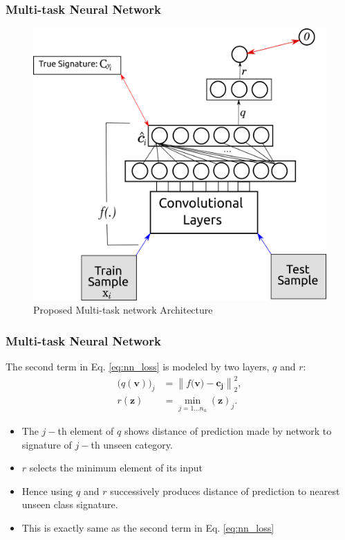\documentclass{beamer}
\newcommand{\normtwo}[1]{\left \lVert #1 \right \rVert_2^2}
\begin{document}
\begin{frame}\frametitle{Multi-task Neural Network}
  \begin{figure}
  \includegraphics[scale=0.4]{net}
  \caption{Proposed Multi-task network Architecture}
  \end{figure}
\end{frame}

\begin{frame}\frametitle{Multi-task Neural Network}
The second term in Eq. \eqref{eq:nn_loss} is modeled by two layers, $q$ and $r$:
\begin{align}
\label{eq:min_layer}
\big(q(\mathbf{v})\big )_j &=  \normtwo{f(\mathbf{v) - c_j}}, \\
r(\mathbf{z}) &= \min_{j=1\ldots n_u} (\mathbf{z})_j.
\end{align}
\begin{itemize}
  \item The $j-$th element of $q$ shows distance of prediction made by network to signature of $j-$th unseen category.
  \item $r$ selects the minimum element of its input
  \item Hence using $q$ and $r$ successively produces distance of prediction to nearest unseen class signature.
  \item This is exactly same as the second term in Eq. \eqref{eq:nn_loss}
\end{itemize}
\end{frame}
\end{document}
